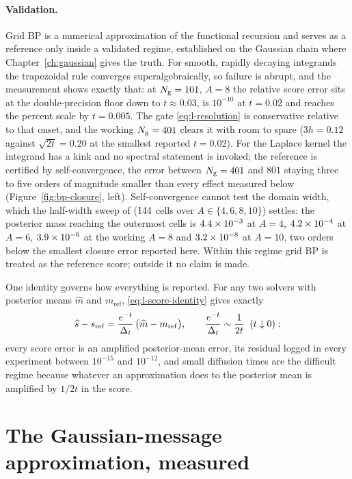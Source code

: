 \paragraph{Validation.} Grid BP is a numerical approximation of the
functional recursion and serves as a reference only inside a validated
regime, established on the Gaussian chain where Chapter~\ref{ch:gaussian}
gives the truth. For smooth, rapidly decaying integrands the trapezoidal rule
converges superalgebraically, so failure is abrupt, and the measurement shows
exactly that: at $N_{\mathrm{g}} = 101$, $A = 8$ the relative score error sits at the
double-precision floor down to $t \approx 0.03$, is $10^{-10}$ at $t = 0.02$
and reaches the percent scale by $t = 0.005$. The gate
\eqref{eq:l-resolution} is conservative relative to that onset, and the
working $N_{\mathrm{g}} = 401$ clears it with room to spare ($3h = 0.12$ against
$\sqrt{2t} = 0.20$ at the smallest reported $t = 0.02$). For the Laplace
kernel the integrand has a kink and no spectral statement is invoked; the
reference is certified by self-convergence, the error between $N_{\mathrm{g}} = 401$
and $801$ staying three to five orders of magnitude smaller than every effect
measured below (Figure~\ref{fig:bp-closure}, left). Self-convergence cannot
test the domain width, which the half-width sweep of 
($144$ cells over $A \in \{4,6,8,10\}$) settles: the posterior mass
reaching the outermost cells is $4.4 \times 10^{-3}$ at $A = 4$, $4.2 \times 10^{-4}$ at
$A = 6$, $3.9 \times 10^{-6}$ at the working $A = 8$ and $3.2 \times 10^{-8}$ at
$A = 10$, two orders below the smallest closure error reported here. Within
this regime grid BP is treated as the reference score; outside it no claim is
made.

One identity governs how everything is reported. For any two solvers with
posterior means $\widehat m$ and $m_{\mathrm{ref}}$,
\eqref{eq:l-score-identity} gives exactly
\begin{equation}
  \widehat s - s_{\mathrm{ref}}
  = \frac{e^{-t}}{\Delta_t}\,\big( \widehat m - m_{\mathrm{ref}} \big),
  \qquad
  \frac{e^{-t}}{\Delta_t} \sim \frac{1}{2t} \;\; (t \downarrow 0):
  \label{eq:bp-master-error}
\end{equation}
every score error is an amplified posterior-mean error, its residual logged in
every experiment between $10^{-15}$ and $10^{-12}$, and small diffusion times
are the difficult regime because whatever an approximation does to the
posterior mean is amplified by $1/2t$ in the score.

\section{The Gaussian-message approximation, measured}
\label{sec:l-closure}

